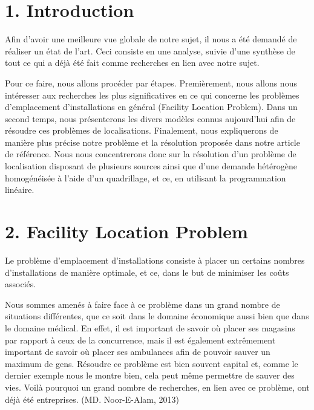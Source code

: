  \section*{1. Introduction}
\bigskip
 
Afin d'avoir une meilleure vue globale de notre sujet, il nous a été demandé de réaliser un état de l'art. Ceci consiste en une analyse, suivie d'une synthèse de tout ce qui a déjà été fait comme recherches en lien avec notre sujet.

\bigskip

Pour ce faire, nous allons procéder par étapes. Premièrement, nous allons nous intéresser aux recherches les plus significatives en ce qui concerne les problèmes d'emplacement d'installations en général (Facility Location Problem). Dans un second temps, nous présenterons les divers modèles connus aujourd'hui afin de résoudre ces problèmes de localisations. Finalement, nous expliquerons de manière plus précise notre problème et la résolution proposée dans notre article de référence. Nous nous concentrerons donc sur la résolution d'un problème de localisation disposant de plusieurs sources ainsi que d'une demande hétérogène homogénéisée à l'aide d'un quadrillage, et ce, en utilisant la programmation linéaire.
 
\clearpage
 
\section*{2. Facility Location Problem}
\bigskip

Le problème d'emplacement d'installations consiste à placer un certains nombres d'installations de manière optimale, et ce, dans le but de minimiser les coûts associés.

\bigskip

Nous sommes amenés à faire face à ce problème dans un grand nombre de situations différentes, que ce soit dans le domaine économique aussi bien que dans le domaine médical. En effet, il est important de savoir où placer ses magasins par rapport à ceux de la concurrence, mais il est également extrêmement important de savoir où placer ses ambulances afin de pouvoir sauver un maximum de gens. Résoudre ce problème est bien souvent capital et, comme le dernier exemple nous le montre bien, cela peut même permettre de sauver des vies. Voilà pourquoi un grand nombre de recherches, en lien avec ce problème, ont déjà été entreprises. (MD. Noor-E-Alam, 2013)

\bigskip

